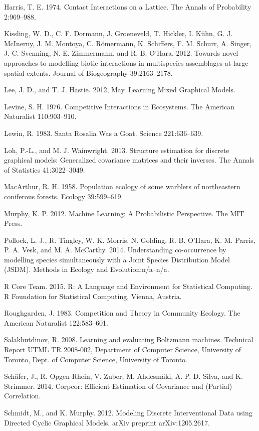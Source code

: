 \documentclass[12pt,]{article}
\begin{document}
\begin{spacing}{1.9}
\begin{flushleft}
Harris, T. E. 1974. Contact Interactions on a Lattice. The Annals of
Probability 2:969--988.

Kissling, W. D., C. F. Dormann, J. Groeneveld, T. Hickler, I. Kühn, G.
J. McInerny, J. M. Montoya, C. Römermann, K. Schiffers, F. M. Schurr, A.
Singer, J.-C. Svenning, N. E. Zimmermann, and R. B. O'Hara. 2012.
Towards novel approaches to modelling biotic interactions in
multispecies assemblages at large spatial extents. Journal of
Biogeography 39:2163--2178.

Lee, J. D., and T. J. Hastie. 2012, May. Learning Mixed Graphical
Models.

Levine, S. H. 1976. Competitive Interactions in Ecosystems. The American
Naturalist 110:903--910.

Lewin, R. 1983. Santa Rosalia Was a Goat. Science 221:636--639.

Loh, P.-L., and M. J. Wainwright. 2013. Structure estimation for
discrete graphical models: Generalized covariance matrices and their
inverses. The Annals of Statistics 41:3022--3049.

MacArthur, R. H. 1958. Population ecology of some warblers of
northeastern coniferous forests. Ecology 39:599--619.

Murphy, K. P. 2012. Machine Learning: A Probabilistic Perspective. The
MIT Press.

Pollock, L. J., R. Tingley, W. K. Morris, N. Golding, R. B. O'Hara, K.
M. Parris, P. A. Vesk, and M. A. McCarthy. 2014. Understanding
co-occurrence by modelling species simultaneously with a Joint Species
Distribution Model (JSDM). Methods in Ecology and Evolution:n/a--n/a.

R Core Team. 2015. R: A Language and Environment for Statistical
Computing. R Foundation for Statistical Computing, Vienna, Austria.

Roughgarden, J. 1983. Competition and Theory in Community Ecology. The
American Naturalist 122:583--601.

Salakhutdinov, R. 2008. Learning and evaluating Boltzmann machines.
Technical Report UTML TR 2008-002, Department of Computer Science,
University of Toronto, Dept. of Computer Science, University of Toronto.

Schäfer, J., R. Opgen-Rhein, V. Zuber, M. Ahdesmäki, A. P. D. Silva, and
K. Strimmer. 2014. Corpcor: Efficient Estimation of Covariance and
(Partial) Correlation.

Schmidt, M., and K. Murphy. 2012. Modeling Discrete Interventional Data
using Directed Cyclic Graphical Models. arXiv preprint arXiv:1205.2617.


\end{flushleft}
\end{spacing}
\end{document}

